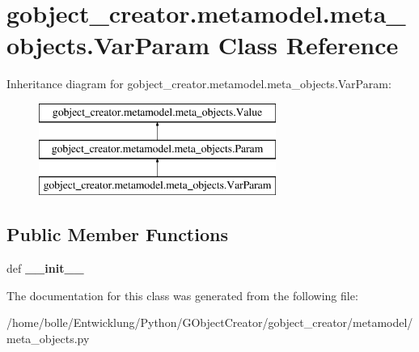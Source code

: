 \hypertarget{classgobject__creator_1_1metamodel_1_1meta__objects_1_1VarParam}{
\section{gobject\_\-creator.metamodel.meta\_\-objects.VarParam Class Reference}
\label{classgobject__creator_1_1metamodel_1_1meta__objects_1_1VarParam}
}
Inheritance diagram for gobject\_\-creator.metamodel.meta\_\-objects.VarParam:\begin{figure}[H]
\begin{center}
\leavevmode
\includegraphics[height=3cm]{classgobject__creator_1_1metamodel_1_1meta__objects_1_1VarParam}
\end{center}
\end{figure}
\subsection*{Public Member Functions}
\begin{DoxyCompactItemize}
\item 
\hypertarget{classgobject__creator_1_1metamodel_1_1meta__objects_1_1VarParam_aa3884721a60748460802dccaba71cf65}{
def {\bfseries \_\-\_\-init\_\-\_\-}}
\label{classgobject__creator_1_1metamodel_1_1meta__objects_1_1VarParam_aa3884721a60748460802dccaba71cf65}

\end{DoxyCompactItemize}


The documentation for this class was generated from the following file:\begin{DoxyCompactItemize}
\item 
/home/bolle/Entwicklung/Python/GObjectCreator/gobject\_\-creator/metamodel/meta\_\-objects.py\end{DoxyCompactItemize}
